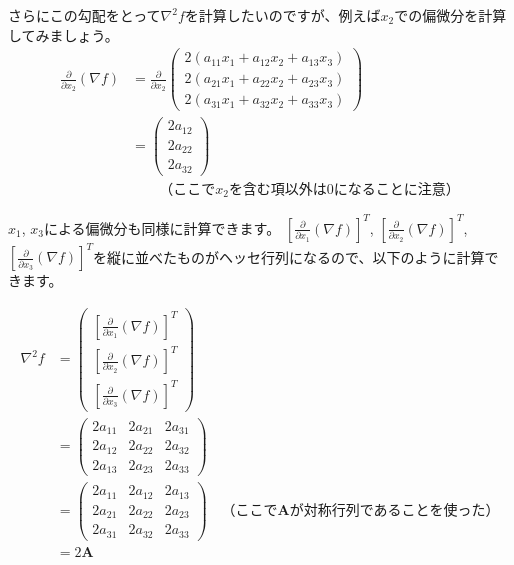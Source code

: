 \documentclass[11pt]{article}
\begin{document}
さらにこの勾配をとって$\nabla^2 f$を計算したいのですが、例えば$x_2$での偏微分を計算してみましょう。
\begin{align*}
  \frac{\partial}{\partial x_2} (\nabla f)
  &=
  \frac{\partial}{\partial x_2}
\begin{pmatrix}
  2 ( a_{11} x_1 + a_{12} x_2 + a_{13} x_3 )\\
  2 ( a_{21} x_1 + a_{22} x_2 + a_{23} x_3 )\\
  2 ( a_{31} x_1 + a_{32} x_2 + a_{33} x_3 )
\end{pmatrix}\\
&=
\begin{pmatrix}
  2 a_{12} \\
  2 a_{22} \\
  2 a_{32}
\end{pmatrix}\\
&\qquad\text{（ここで$x_2$を含む項以外は0になることに注意）}
\end{align*}

$x_1$, $x_3$による偏微分も同様に計算できます。
$\left[\frac{\partial}{\partial x_1} (\nabla f)\right]^T$, 
$\left[\frac{\partial}{\partial x_2} (\nabla f)\right]^T$, 
$\left[\frac{\partial}{\partial x_3} (\nabla f)\right]^T$を縦に並べたものがヘッセ行列になるので、以下のように計算できます。

\begin{align*}
  \nabla^2 f &=
  \begin{pmatrix}
    \left[\frac{\partial}{\partial x_1} (\nabla f)\right]^T\\
    \left[\frac{\partial}{\partial x_2} (\nabla f)\right]^T\\
    \left[\frac{\partial}{\partial x_3} (\nabla f)\right]^T
  \end{pmatrix}\\
  &=
  \begin{pmatrix}
    2 a_{11} & 2 a_{21} & 2 a_{31}\\
    2 a_{12} & 2 a_{22} & 2 a_{32}\\
    2 a_{13} & 2 a_{23} & 2 a_{33}
  \end{pmatrix}\\
  &=
  \begin{pmatrix}
    2 a_{11} & 2 a_{12} & 2 a_{13}\\
    2 a_{21} & 2 a_{22} & 2 a_{23}\\
    2 a_{31} & 2 a_{32} & 2 a_{33}
  \end{pmatrix}
  \quad\text{（ここで$\bm{A}$が対称行列であることを使った）}\\
  &=2\bm{A}
\end{align*}
\end{document}
